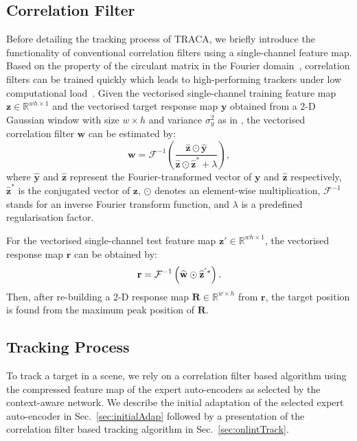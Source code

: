 \documentclass[10pt,twocolumn,letterpaper]{article}
\begin{document}
 \subsection{Correlation Filter} \label{sec:correlationfilter}
Before detailing the tracking process of TRACA, we briefly introduce the functionality of conventional correlation filters using a single-channel feature map.
Based on the property of the circulant matrix in the Fourier domain~\cite{ref:cirMatrix}, correlation filters can be trained quickly which leads to high-performing trackers under low computational load~\cite{ref:KCF}. 
Given the vectorised single-channel training feature map $\mathbf{z}\in\mathbb{R}^{wh\times 1}$ 
and the vectorised target response map $\mathbf{y}$ obtained from a 2-D Gaussian window with size $w\times h$ and variance $\sigma_y^2$ as in \cite{ref:KCF}, the vectorised correlation filter $\mathbf{w}$ can be estimated by:
\begin{equation} \label{eq:cf}
\mathbf{w} = \mathcal{F}^{-1} \left( \frac{\widehat{\mathbf{z}} \odot \widehat{\mathbf{y}}}{\widehat{\mathbf{z}}\odot \widehat{\mathbf{z}}^* + \lambda} \right),
\end{equation}
where $\hat{\mathbf{y}}$ and $\hat{\mathbf{z}}$ represent the Fourier-transformed vector of $\mathbf{y}$ and $\widehat{\mathbf{z}}$ respectively, $\widehat{\mathbf{z}}^*$ is the conjugated vector of $\mathbf{z}$, $\odot$ denotes an element-wise multiplication, $\mathcal{F}^{-1}$ stands for an inverse Fourier transform function, and $\lambda$ is a predefined regularisation factor.


For the vectorised single-channel test feature map $\mathbf{z}'\in\mathbb{R}^{wh\times 1}$, the vectorised response map $\mathbf{r}$ can be obtained by:
\vspace{-2mm}
\begin{equation}\label{eq:cfrs}
\mathbf{r} = \mathcal{F}^{-1} \left( \widehat{\mathbf{w}} \odot \widehat{\mathbf{z}}^{'*}\right).
\vspace{-2mm}
\end{equation}
Then, after re-building a 2-D response map $\mathbf{R}\in\mathbb{R}^{w\times h}$ from $\mathbf{r}$, the target position is found from the maximum peak position of $\mathbf{R}$.

 \subsection{Tracking Process}
\label{Sec:tracking}
To track a target in a scene, we rely on a correlation filter based algorithm using the compressed feature map of the expert auto-encoders as selected by the context-aware network. 
We describe the initial adaptation of the selected expert auto-encoder in Sec.~\ref{sec:initialAdap} followed by a presentation of the correlation filter based tracking algorithm in Sec.~\ref{sec:onlintTrack}.
\end{document}
